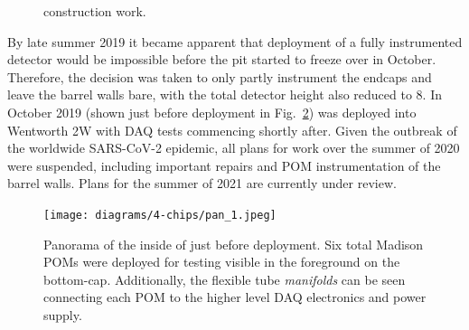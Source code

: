 \begin{figure} %
    \centering
    \quad
    \caption[More \chipsfive construction work.]
    {\chipsfive construction work.}
    \label{fig:work2}
\end{figure}

By late summer 2019 it became apparent that deployment of a fully instrumented detector would be
impossible before the pit started to freeze over in October. Therefore, the decision was taken to
only partly instrument the endcaps and leave the barrel walls bare, with the total detector height
also reduced to \unit{8}{}. In October 2019 \chipsfive (shown just before deployment in
Fig.~\ref{fig:pan_1}) was deployed into Wentworth 2W with DAQ tests commencing shortly after.
Given the outbreak of the worldwide SARS-CoV-2 epidemic, all plans for work over the summer of
2020 were suspended, including important repairs and POM instrumentation of the barrel walls.
Plans for the summer of 2021 are currently under review.

\begin{figure} %
    \texttt{[image: diagrams/4-chips/pan\_1.jpeg]}
    \caption[Panorama of the inside of \chipsfive just before deployment.]
    {Panorama of the inside of \chipsfive just before deployment. Six total Madison POMs were
        deployed for testing visible in the foreground on the bottom-cap. Additionally, the
        flexible tube \emph{manifolds} can be seen connecting each POM to the higher level DAQ
        electronics and power supply.}
    \label{fig:pan_1}
\end{figure}

